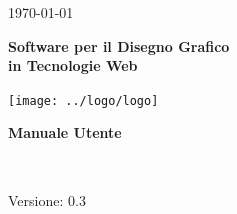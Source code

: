 \usepackage{multirow}
\title{\TITOLODOC}
\author{Marco Cunico}



\renewcommand{\insertversion}{0.3} %
\renewcommand{\TITOLODOC}{Manuale Utente} %
\renewcommand{\glosspath}{.\glossario} %

\begin{titlepage}
\begin{center}
	\begin{Large}	\today \end{Large}
\end{center}

\vspace{20pt}

\begin{center}
	\begin{Huge}
				\textbf{\ajax}
	\end{Huge}
\end{center}			

\begin{center}
	\begin{large}
				\textbf{Software per il Disegno Grafico\\ in Tecnologie Web}
	\end{large}
\end{center}			

\vspace{20pt}

\begin{center}
\texttt{[image: ../logo/logo]}
\end{center}

\vspace{170pt}
\begin{center} %
	\begin{Huge}
				\textbf{\TITOLODOC}
	\end{Huge}
			\\
\end{center}
\vspace{190pt}
\begin{center}
Versione: \insertversion
\end{center}
\end{titlepage}

\newpage


